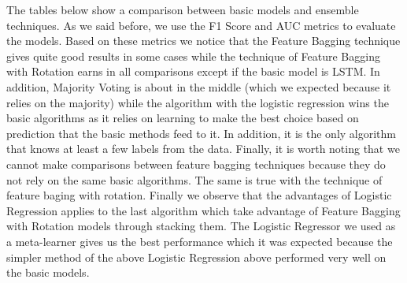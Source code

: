 \documentclass[a4paper,12pt]{report}
\theoremstyle{definitionNODot}
\begin{document}
	The tables below show a comparison between basic models and ensemble techniques. As we said before, we use the F1 Score and AUC metrics to evaluate the models. Based on these metrics we notice that the Feature Bagging technique gives quite good results in some cases while the technique of Feature Bagging with Rotation earns in all comparisons except if the basic model is LSTM. In addition, Majority Voting is about in the middle (which we expected because it relies on the majority) while the algorithm with the logistic regression wins the basic algorithms as it relies on learning to make the best choice based on prediction that the basic methods feed to it. In addition, it is the only algorithm that knows at least a few labels from the data. Finally, it is worth noting that we cannot make comparisons between feature bagging techniques because they do not rely on the same basic algorithms. The same is true with the technique of feature baging with rotation. Finally we observe that the advantages of Logistic Regression applies to the last algorithm which take advantage of Feature Bagging with Rotation models through stacking them. The Logistic Regressor we used as a meta-learner gives us the best performance which it was expected because the simpler method of the above Logistic Regression above performed very well on the basic models.
	
	\begin{table}[H]
		\centering
		\caption{Autoencoder}
		\label{tab:comptabautoencoder}
	\end{table}
	
\end{document}

